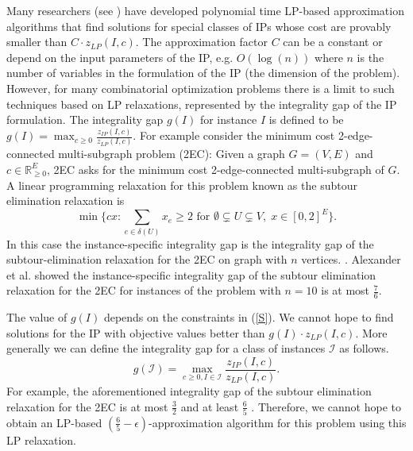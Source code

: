 Many researchers (see \cite{davids,vazirani}) have developed polynomial time LP-based approximation algorithms that find solutions for special classes of IPs whose cost are provably smaller than $C\cdot z_{LP}(I,c)$. The approximation factor $C$ can be a constant or depend on the input parameters of the IP, e.g. $O(\log(n))$ where $n$ is the number of variables in the formulation of the IP (the dimension of the problem). However, for many combinatorial optimization problems there is a limit to such techniques based on LP relaxations, represented  by the {integrality gap} of the IP formulation. The integrality gap $g(I)$ for instance $I$ is defined to be $g(I)= \max_{c\geq 0}\frac{z_{IP}(I,c)}{z_{LP}(I,c)}$.  For example consider the minimum cost 2-edge-connected multi-subgraph problem (2EC): Given a graph $G=(V,E)$ and $c\in \mathbb{R}^E_{\geq 0}$, 2EC asks for the minimum cost 2-edge-connected multi-subgraph of $G$. A linear programming relaxation for this problem known as the subtour elimination relaxation  is
 \begin{equation}\min \{cx: \sum_{e\in \delta(U)}x_e \geq 2 \mbox{ for } \emptyset \subsetneq U \subsetneq V,\; x\in [0,2]^{E}\}. 
 \end{equation}
 In this case the instance-specific integrality gap is the integrality gap of the subtour-elimination relaxation for the 2EC on graph with $n$ vertices.  . Alexander et al. \cite{alexander2006integrality} showed the instance-specific integrality gap of the subtour elimination relaxation for the 2EC for instances of the problem with $n= 10$ is at most $\frac{7}{6}$.

The value of $g(I)$ depends on the constraints in (\ref{S}).  We cannot hope to find solutions for the IP with objective values better than $g(I)\cdot z_{LP}(I,c)$. More generally we can define the integrality gap for a class of instances $\mathcal{I}$ as follows.%
\begin{equation}\label{gapproblem}
g(\mathcal{I}) = \max_{c\geq 0 , I\in\mathcal{I}}\frac{z_{IP}(I,c)}{z_{LP}(I,c)}.
\end{equation}
For example, the aforementioned integrality gap of the subtour elimination relaxation for the 2EC is at most $\frac{3}{2}$ \cite{wolsey} and at least $\frac{6}{5}$ \cite{alexander2006integrality}. Therefore, we cannot hope to obtain an LP-based $(\frac{6}{5}-\epsilon)$-approximation algorithm for this problem using this LP relaxation.


